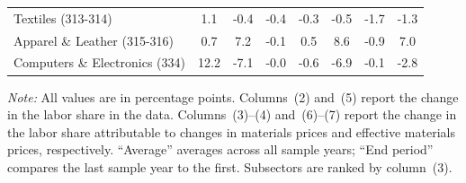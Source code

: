 \begin{table}[htbp]
{\begin{tabular}{l c ccc ccc}
Textiles (313-314) & 1.1 & -0.4 & -0.4 & -0.3 & -0.5 & -1.7 & -1.3 \\
Apparel \& Leather (315-316) & 0.7 & 7.2 & -0.1 & 0.5 & 8.6 & -0.9 & 7.0 \\
Computers \& Electronics (334) & 12.2 & -7.1 & -0.0 & -0.6 & -6.9 & -0.1 & -2.8 \\
\bottomrule
\end{tabular}}
\vspace{2mm}
\parbox{\textwidth}{\small \textit{Note:} All values are in percentage points. Columns~(2) and~(5) report the change in the labor share in the data. Columns~(3)--(4) and~(6)--(7) report the change in the labor share attributable to changes in materials prices and effective materials prices, respectively. ``Average'' averages across all sample years; ``End period'' compares the last sample year to the first. Subsectors are ranked by column~(3).}
\end{table}